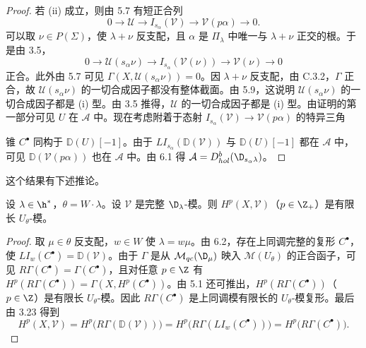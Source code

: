 \begin{proof}
若 (ii) 成立，则由 5.7 有短正合列
$$0\longrightarrow\mathcal{U}\longrightarrow I_{s_\alpha}(\mathcal{V})\longrightarrow\mathcal{V}(p\alpha)\longrightarrow 0.$$
可以取 $\nu\in P(\Sigma)$，使 $\lambda+\nu$ 反支配，且 $\alpha$ 是 $\Pi_\lambda$ 中唯一与 $\lambda+\nu$ 正交的根。于是由 3.5，
$$0\longrightarrow\mathcal{U}(s_\alpha\nu)\longrightarrow I_{s_\alpha}(\mathcal{V}(\nu))\longrightarrow\mathcal{V}(\nu)\longrightarrow 0$$
正合。此外由 5.7 可见 $\Gamma(X,\mathcal{U}(s_\alpha\nu))=0$。因 $\lambda+\nu$ 反支配，由 C.3.2，$\Gamma$ 正合，故 $\mathcal{U}(s_\alpha\nu)$ 的一切合成因子都没有整体截面。由 5.9，这说明 $\mathcal{U}(s_\alpha\nu)$ 的一切合成因子都是 (i) 型。由 3.5 推得，$\mathcal{U}$ 的一切合成因子都是 (i) 型。由证明的第一部分可见 $U$ 在 $\mathcal{A}$ 中。现在考虑附着于态射 $I_{s_\alpha}(\mathcal{V})\to\mathcal{V}(p\alpha)$ 的特异三角
\begin{center}
\end{center}
锥 $C^\bullet$ 同构于 $\mathbb{D}(U)[-1]$。由于 $LI_{s_\alpha}(\mathbb{D}(\mathcal{V}))$ 与 $\mathbb{D}(U)[-1]$ 都在 $\mathcal{A}$ 中，可见 $\mathbb{D}(\mathcal{V}(p\alpha))$ 也在 $\mathcal{A}$ 中。由 6.1 得 $\mathcal{A}=D^b_{hol}(\D_{s_\alpha\lambda})$。
\end{proof}

这个结果有下述推论。

\begin{theorem}\label{thm:03.6.3}
设 $\lambda\in\h^*$，$\theta=W\cdot\lambda$。设 $\mathcal{V}$ 是完整 $\D_\lambda$-模。则 $H^p(X,\mathcal{V})$（$p\in\Z_+$）是有限长 $U_\theta$-模。
\end{theorem}

\begin{proof}
取 $\mu\in\theta$ 反支配，$w\in W$ 使 $\lambda=w\mu$。由 6.2，存在上同调完整的复形 $C^\bullet$，使 $LI_w(C^\bullet)=\mathbb{D}(\mathcal{V})$。由于 $\Gamma$ 是从 $\mathcal{M}_{qc}(\D_\mu)$ 映入 $\mathcal{M}(U_\theta)$ 的正合函子，可见 $R\Gamma(C^\bullet)=\Gamma(C^\bullet)$，且对任意 $p\in\Z$ 有 $H^p(R\Gamma(C^\bullet))=\Gamma(X,H^p(C^\bullet))$。由 5.1 还可推出，$H^p(R\Gamma(C^\bullet))$（$p\in\Z$）是有限长 $U_\theta$-模。因此 $R\Gamma(C^\bullet)$ 是上同调模有限长的 $U_\theta$-模复形。最后由 3.23 得到
$$H^p(X,\mathcal{V})=H^p\bigl(R\Gamma(\mathbb{D}(\mathcal{V}))\bigr)=H^p\bigl(R\Gamma(LI_w(C^\bullet))\bigr)=H^p\bigl(R\Gamma(C^\bullet)\bigr).$$
\end{proof}

